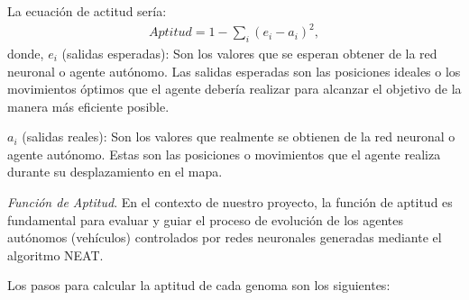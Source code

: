 \documentclass[conference]{IEEEtran}
\begin{document}
La ecuación de actitud sería:
\begin{align*}
    Aptitud = 1 - \sum_{i} (e_i - a_i)^2,
\end{align*}
donde, $e_i$ (salidas esperadas): Son los valores que se esperan obtener de la red neuronal o agente autónomo. Las salidas esperadas son las posiciones ideales o los movimientos óptimos que el agente debería realizar para alcanzar el objetivo de la manera más eficiente posible. 

$a_i$ (salidas reales): Son los valores que realmente se obtienen de la red neuronal o agente autónomo. Estas son las posiciones o movimientos que el agente realiza durante su desplazamiento en el mapa.


\textit{Función de Aptitud}. En el contexto de nuestro proyecto, la función de aptitud es fundamental para evaluar y guiar el proceso de evolución de los agentes autónomos (vehículos) controlados por redes neuronales generadas mediante el algoritmo NEAT. 

Los pasos para calcular la aptitud de cada genoma son los siguientes:
\end{document}
